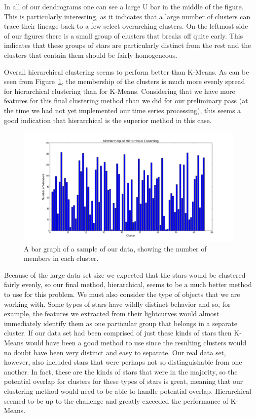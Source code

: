 \documentclass[12pt]{article}
\begin{document}
In all of our dendrograms one can see a large U bar in the middle of the figure.
This is particularly interesting, as it indicates that a large number of clusters can trace their lineage back to a few select overarching clusters.
On the leftmost side of our figures there is a small group of clusters that breaks off quite early.
This indicates that these groups of stars are particularly distinct from the rest and the clusters that contain them should be fairly homogeneous. 

Overall hierarchical clustering seems to perform better than K-Means.
As can be seen from Figure~\ref{fig:Bar_Samp}, the membership of the clusters is much more evenly spread for hierarchical clustering than for K-Means.
Considering that we have more features for this final clustering method than we did for our preliminary pass (at the time we had not yet implemented our time series processing), this seems a good indication that hierarchical is the superior method in this case.

\begin{figure}
    \includegraphics[width=\textwidth]{bar_pop_samp.png}
    \caption{A bar graph of a sample of our data, showing the number of members in each cluster.}
    \label{fig:Bar_Samp}
    
\end{figure}


Because of the large data set size we expected that the stars would be clustered fairly evenly, so our final method, hierarchical, seems to be a much better method to use for this problem.
We must also consider the type of objects that we are working with.
Some types of stars have wildly distinct behavior and so, for example, the features we extracted from their lightcurves would almost immediately identify them as one particular group that belongs in a separate cluster.
If our data set had been comprised of just these kinds of stars then K-Means would have been a good method to use since the resulting clusters would no doubt have been very distinct and easy to separate.
Our real data set, however, also included stars that were perhaps not so distinguishable from one another.
In fact, these are the kinds of stars that were in the majority, so the potential overlap for clusters for these types of stars is great, meaning that our clustering method would need to be able to handle potential overlap.
Hierarchical seemed to be up to the challenge and greatly exceeded the performance of K-Means.
\end{document}
